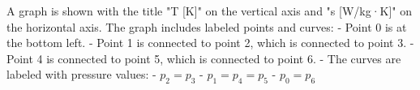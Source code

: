 A graph is shown with the title "T [K]" on the vertical axis and "s [W/kg·K]" on the horizontal axis. The graph includes labeled points and curves:  
- Point 0 is at the bottom left.  
- Point 1 is connected to point 2, which is connected to point 3.  
- Point 4 is connected to point 5, which is connected to point 6.  
- The curves are labeled with pressure values:  
  - \( p_2 = p_3 \)  
  - \( p_1 = p_4 = p_5 \)  
  - \( p_0 = p_6 \)